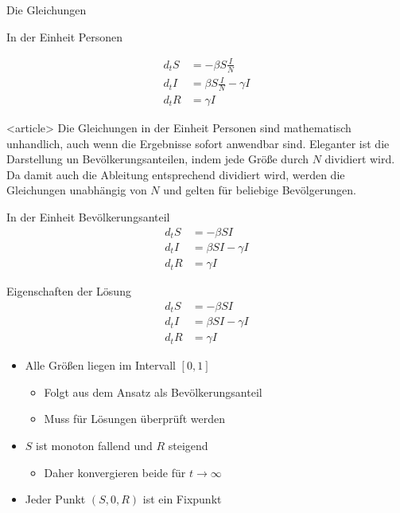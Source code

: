 \begin{frame}{Die Gleichungen}
  \begin{block}{In der Einheit \glqq{}Personen\grqq{}}

    \begin{align*}
      d_t S &=-\beta S\frac IN\\
      d_t I &=\beta S\frac IN - \gamma I\\
      d_t R &=\gamma I
    \end{align*}  
  \end{block}

  \begin{onlyenv}<article> Die Gleichungen in der Einheit Personen
    sind mathematisch unhandlich, auch wenn die Ergebnisse sofort
    anwendbar sind. Eleganter ist die Darstellung un
    Bevölkerungsanteilen, indem jede Größe durch $N$ dividiert
    wird. Da damit auch die Ableitung entsprechend dividiert wird,
    werden die Gleichungen unabhängig von $N$ und gelten für beliebige
    Bevölgerungen.
  \end{onlyenv}
  \begin{block}{In der Einheit \glqq{}Bevölkerungsanteil\grqq{}}
    \begin{align*}
      d_t S &=-\beta SI\\
      d_t I &=\beta SI - \gamma I\\
      d_t R &=\gamma I
    \end{align*}  
  \end{block}
\end{frame}

\begin{frame}{Eigenschaften der Lösung}
  \begin{align*}
    d_t S &=-\beta SI\\
    d_t I &=\beta SI - \gamma I\\
    d_t R &=\gamma I
  \end{align*}  
  \begin{itemize}
  \item Alle Größen liegen im Intervall $[0,1]$
    \begin{itemize}
    \item Folgt aus dem Ansatz als Bevölkerungsanteil
    \item Muss für Lösungen überprüft werden
    \end{itemize}
  \item $S$ ist monoton fallend und $R$ steigend
    \begin{itemize}
    \item Daher konvergieren beide für $t\to\infty$
    \end{itemize}
  \item Jeder Punkt $(S,0,R)$ ist ein Fixpunkt
  \end{itemize}
\end{frame}

